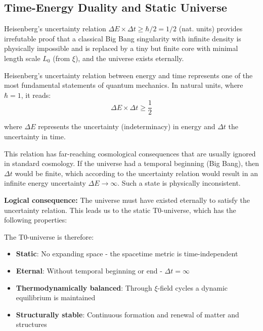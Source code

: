 \documentclass[12pt,a4paper]{report}
\begin{document}
	\subsection{Time-Energy Duality and Static Universe}
	
	\begin{important}
		Heisenberg's uncertainty relation $\Delta E \times \Delta t \geq \hbar/2 = 1/2$ (nat. units) provides irrefutable proof that a classical Big Bang singularity with infinite density is physically impossible and is replaced by a tiny but finite core with minimal length scale $L_0$ (from $\xi$), and the universe exists eternally.
	\end{important}
	
	Heisenberg's uncertainty relation between energy and time represents one of the most fundamental statements of quantum mechanics. In natural units, where $\hbar = 1$, it reads:
	\begin{equation}
		\Delta E \times \Delta t \geq \frac{1}{2}
	\end{equation}
	
	where $\Delta E$ represents the uncertainty (indeterminacy) in energy and $\Delta t$ the uncertainty in time.
	
	This relation has far-reaching cosmological consequences that are usually ignored in standard cosmology. If the universe had a temporal beginning (Big Bang), then $\Delta t$ would be finite, which according to the uncertainty relation would result in an infinite energy uncertainty $\Delta E \to \infty$. Such a state is physically inconsistent.
	
	\textbf{Logical consequence:} The universe must have existed eternally to satisfy the uncertainty relation. This leads us to the static T0-universe, which has the following properties:
	
	The T0-universe is therefore:
	\begin{itemize}
		\item \textbf{Static}: No expanding space - the spacetime metric is time-independent
		\item \textbf{Eternal}: Without temporal beginning or end - $\Delta t = \infty$
		\item \textbf{Thermodynamically balanced}: Through $\xi$-field cycles a dynamic equilibrium is maintained
		\item \textbf{Structurally stable}: Continuous formation and renewal of matter and structures
	\end{itemize}
	
\end{document}
